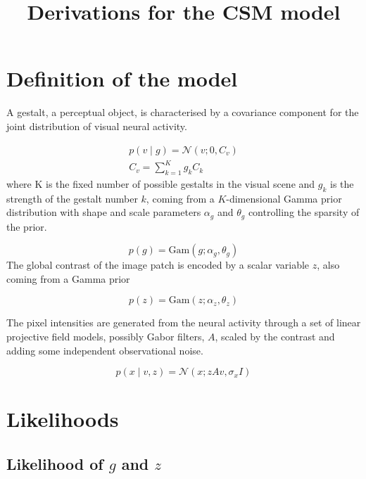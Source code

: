 \documentclass{paper}
\begin{document}
\title{Derivations for the CSM model}
\maketitle

\section{Definition of the model}

A gestalt, a perceptual object, is characterised by a covariance component for the joint distribution of visual neural activity. 

\begin{eqnarray}
p(v \mid g) = \mathcal{N}(v; 0,C_v) \\
C_v = \sum_{k=1}^K g_k C_k \label{eq:cv}
\end{eqnarray}
%
where K is the fixed number of possible gestalts in the visual scene and $g_k$ is the strength of the gestalt number $k$, coming from a $K$-dimensional Gamma prior distribution with shape and scale  parameters $\alpha_g$ and $\theta_g$ controlling the sparsity of the prior.

\begin{equation}
p(g) = \textrm{Gam}(g; \alpha_g,\theta_g)
\end{equation}
%
The global contrast of the image patch is encoded by a scalar variable $z$, also coming from a Gamma prior

\begin{equation}
p(z) = \textrm{Gam}(z; \alpha_z,\theta_z)
\end{equation}

The pixel intensities are generated from the neural activity through a set of linear projective field models, possibly Gabor filters, $A$, scaled by the contrast and adding some independent observational noise.

\begin{equation}
p(x \mid v,z) = \mathcal{N}(x; zAv,\sigma_x I)
\end{equation}

\section{Likelihoods}

\subsection{Likelihood of $g$ and $z$}
\end{document}
